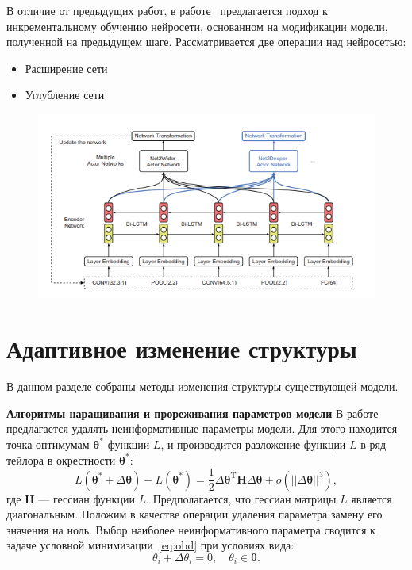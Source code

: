 В отличие от предыдущих работ, в работе~\cite{reinf_deep2net} предлагается подход к инкрементальному обучению нейросети, основанном на модификации модели, полученной на предыдущем шаге. Рассматривается две операции над нейросетью:
\begin{itemize}
\item Расширение сети
\item Углубление сети
\end{itemize}

\begin{figure}[H]
\includegraphics[width=\textwidth]{./plots/arch_review_figs/deep2net.png}
\end{figure}



\section{Адаптивное изменение структуры}
В данном разделе собраны методы изменения структуры существующей модели. 

\textbf{Алгоритмы наращивания и прореживания параметров модели}
В работе~\cite{obd} предлагается удалять неинформативные параметры модели.
Для этого находится точка оптимумам $\boldsymbol{\theta}^{*}$ функции $L$, и производится разложение функции $L$ в ряд тейлора в окрестности $\boldsymbol{\theta}^{*}$:
\begin{equation}
\label{eq:obd}
    L(\boldsymbol{\theta}^{*} + \Delta\boldsymbol{\theta})  - L(\boldsymbol{\theta}^{*}) = \frac{1}{2} \Delta\boldsymbol{\theta}^{\text{T}}\mathbf{H}\Delta\boldsymbol{\theta} + o(||\Delta\boldsymbol{\theta}||^{3}),
\end{equation}
где $\mathbf{H}$ --- гессиан функции $L$. Предполагается, что гессиан матрицы $L$ является диагональным.
Положим в качестве операции удаления параметра замену его значения на ноль. Выбор наиболее неинформативного параметра сводится к задаче условной минимизации~\eqref{eq:obd} при условиях вида:
\[
    {\theta}_i + \Delta{\theta}_i = 0, \quad  {\theta}_i \in \boldsymbol{\theta}.
\] 


